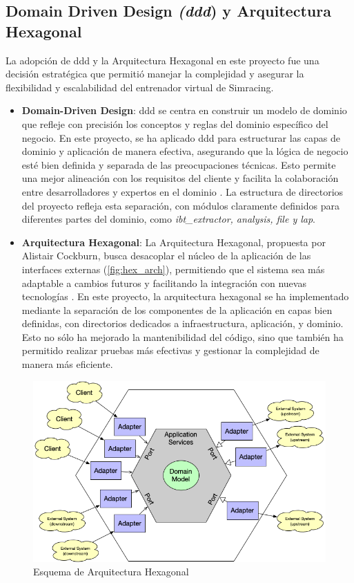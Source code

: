 \subsection{Domain Driven Design \textit{(\ac{ddd}}) y Arquitectura Hexagonal}
La adopción de \ac{ddd} y la Arquitectura Hexagonal en este proyecto fue una decisión estratégica que permitió manejar la complejidad y asegurar la flexibilidad y escalabilidad del entrenador virtual de Simracing.

\begin{itemize}[noitemsep]
\item \textbf{Domain-Driven Design}: \ac{ddd} se centra en construir un modelo de dominio que refleje con precisión los conceptos y reglas del dominio específico del negocio. En este proyecto, se ha aplicado \ac{ddd} para estructurar las capas de dominio y aplicación de manera efectiva, asegurando que la lógica de negocio esté bien definida y separada de las preocupaciones técnicas. Esto permite una mejor alineación con los requisitos del cliente y facilita la colaboración entre desarrolladores y expertos en el dominio \cite{Evans2004}. La estructura de directorios del proyecto refleja esta separación, con módulos claramente definidos para diferentes partes del dominio, como \textit{ibt\_extractor, analysis, file y lap}.
\item \textbf{Arquitectura Hexagonal}: La Arquitectura Hexagonal, propuesta por Alistair Cockburn, busca desacoplar el núcleo de la aplicación de las interfaces externas (\autoref{fig:hex_arch}), permitiendo que el sistema sea más adaptable a cambios futuros y facilitando la integración con nuevas tecnologías \cite{Cockburn2005}. En este proyecto, la arquitectura hexagonal se ha implementado mediante la separación de los componentes de la aplicación en capas bien definidas, con directorios dedicados a infraestructura, aplicación, y dominio. Esto no sólo ha mejorado la mantenibilidad del código, sino que también ha permitido realizar pruebas más efectivas y gestionar la complejidad de manera más eficiente.
\end{itemize}

\begin{figure}[H]
	\centering
	\includegraphics[width=0.5\linewidth]{./figs/herramientas/desarrollo/hexagonal.png}
	\caption[Esquema de Arquitectura Hexagonal]{Esquema de Arquitectura Hexagonal \cite{hexagonal_architecture}}
    \label{fig:hex_arch}
\end{figure}

